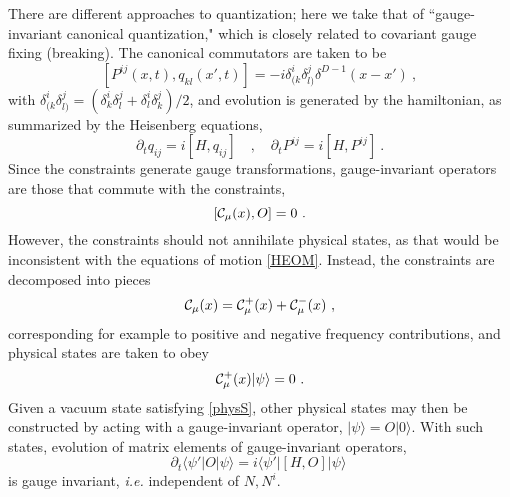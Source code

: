 \documentclass[11pt]{article}
\numberwithin{equation}{section}
\newcommand{\calC}{{\cal C}}
\newcommand{\beq}{\begin{equation}}
\newcommand{\eeq}{\end{equation}}
\begin{document}
There are different approaches to quantization; here we take that of ``gauge-invariant canonical quantization," which is closely related to covariant gauge fixing (breaking)\cite{GiPe2}.  The canonical commutators are taken to be
\beq\label{ccrq}
[P^{ij}(x,t),q_{kl}(x',t)] = -i\delta^i_{(k}\delta^j_{l)}  \delta^{D-1}(x-x')\ ,
\eeq
with $\delta^i_{(k}\delta^j_{l)}=(\delta^i_{k}\delta^j_{l} + \delta^i_l\delta^j_{k})/2$, and evolution is generated by the hamiltonian, as summarized by the Heisenberg equations,
\beq\label{HEOM}
\partial_t q_{ij} = i [H,q_{ij}]\quad ,\quad \partial_t P^{ij} = i [H,P^{ij}]\ .
\eeq
Since the constraints generate gauge transformations, gauge-invariant operators are those that commute with the constraints,
\beq\label{concomm}
[\calC_\mu(x),O]=0\ .
\eeq
However, the constraints should not annihilate physical states, as that would be inconsistent with the equations of motion \eqref{HEOM}.  Instead, the constraints are decomposed into pieces
 \beq\label{condec}
\calC_\mu(x)= \calC_\mu^+(x) + \calC_\mu^-(x)\ ,
\eeq
corresponding for example to positive and negative frequency contributions, and physical states are taken to obey
\beq\label{physS}
\calC_\mu^+(x)|\psi\rangle=0\ .
\eeq
Given a vacuum state satisfying \eqref{physS}, other physical states may then be constructed by acting with a gauge-invariant operator, $|\psi\rangle = O|0\rangle$.  With such states, evolution of matrix elements of gauge-invariant operators, 
\beq\label{MEevo}
\partial_t \langle \psi'|O |\psi\rangle = i\langle \psi'|[H,O]|\psi\rangle\ 
\eeq
is gauge invariant, {\it i.e.} independent of $N, N^i$.  
\end{document}

